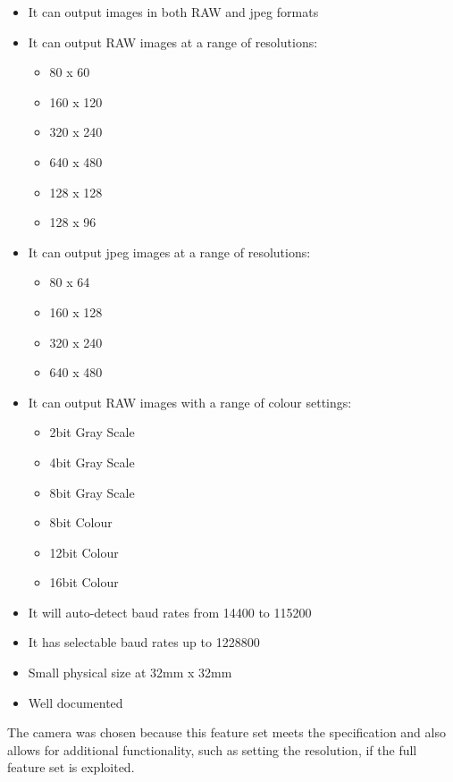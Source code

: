 	\begin{itemize}
		\item It can output images in both RAW and jpeg formats
		\item It can output RAW images at a range of resolutions:
		\begin{itemize}
			\item 80 x 60
			\item 160 x 120
			\item 320 x 240
			\item 640 x 480
			\item 128 x 128
			\item 128 x 96
		\end{itemize}
		\item It can output jpeg images at a range of resolutions:
		\begin{itemize}
			\item 80 x 64
			\item 160 x 128
			\item 320 x 240
			\item 640 x 480
		\end{itemize}
		\item It can output RAW images with a range of colour settings:
		\begin{itemize}
			\item 2bit Gray Scale
			\item 4bit Gray Scale
			\item 8bit Gray Scale
			\item 8bit Colour
			\item 12bit Colour
			\item 16bit Colour
		\end{itemize}
		\item It will auto-detect baud rates from 14400 to 115200
		\item It has selectable baud rates up to 1228800
		\item Small physical size at 32mm x 32mm
		\item Well documented
	\end{itemize}

The camera was chosen because this feature set meets the specification and also allows for additional functionality, such as setting the resolution, if the full feature set is exploited.